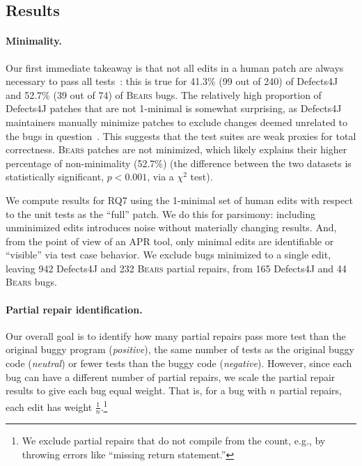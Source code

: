 \documentclass[10pt, conference]{IEEEtran}
\newcommand\bears{\textsc{Bears}\xspace}
\begin{document}
\subsection{Results}

\paragraph{Minimality.} Our first immediate takeaway is that not all edits
in a human patch are always necessary to pass all tests~\cite{api-refactoring,
  tangledchanges}:
this is true for 41.3\%  (99 out of 240) of Defects4J and 52.7\% (39 out of 74) of
\bears bugs. 
The relatively high proportion of Defects4J patches that are not 1-minimal is
somewhat surprising, as Defects4J maintainers manually minimize patches to exclude
changes deemed unrelated to the bugs in question~\cite{documentation-maybe}.
This suggests that the test suites are weak proxies for total correctness.
\bears patches are not minimized, which likely explains
their higher percentage of non-minimality (52.7\%) (the difference between the two datasets is statistically
significant, $p < 0.001$, via a 
$\chi^2$ test).

We compute results for RQ7 using the 1-minimal set of human edits
with respect to the unit tests as the ``full'' patch.
We do this for parsimony: including
unminimized edits introduces noise without materially changing
results.  And, from the point of view of an APR tool, only
minimal edits are identifiable or ``visible'' via test case behavior. 
We exclude bugs
minimized to a single edit, leaving
942 Defects4J and 232 \bears partial repairs, from
165 Defects4J and 44 \bears bugs.  


\paragraph{Partial repair identification.} Our overall goal is to identify how many partial repairs pass more test than the
original buggy program  (\emph{positive}), the  same number of tests as the
original buggy code (\emph{neutral}) or fewer tests than the buggy code
(\emph{negative}).  However, 
since each bug can have a different 
number of partial repairs, we
scale the partial repair results to give each bug equal weight.
That is, for a bug with $n$ partial repairs, each edit has weight 
$\frac{1}{n}$.\footnote{We exclude partial
repairs that do not compile from the count, e.g., by throwing errors like ``missing return statement.''}
\end{document}
